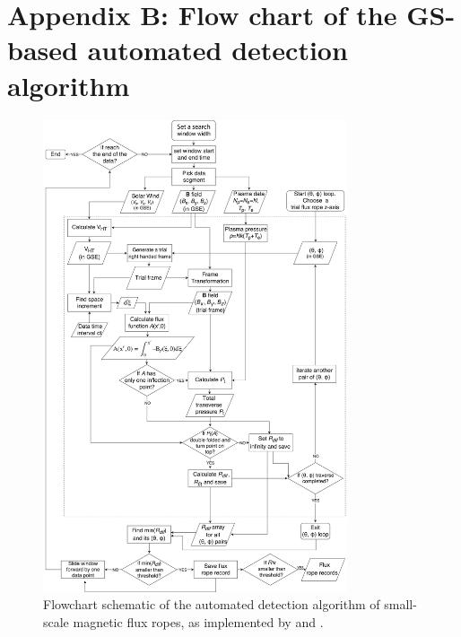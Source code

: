 \chapter{Appendix B: Flow chart of the GS-based automated detection algorithm}\label{appendix:gs-flowchart}

\renewcommand{\thechapter}{B}
\renewcommand{\thefigure}{B.\arabic{figure}}
\setcounter{figure}{0}
\begin{figure}
    \centering
    \includegraphics[width=0.8\textwidth]{Figures/fluxrope_algorithm.jpg}
    \caption[Flowchart of GS-reconstruction based automated detection algorithm]{Flowchart schematic of the automated detection algorithm of small-scale magnetic flux ropes, as implemented by \cite{Hu:2018} and \cite{Zheng:2018}.}
    \label{fig:flowchart}
\end{figure}